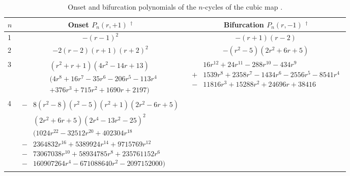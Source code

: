 \documentclass[twocolumn]{revtex4-1}
\begin{document}
\begin{table*}[t]\footnotesize
\caption{Onset and bifurcation polynomials of the $n$-cycles of the cubic map .}
\begin{center}
\begin{tabular*}{\linewidth}{l c c}
\hline
$n$
&
Onset $P_n(r, +1)$ $^\dagger$
&
Bifurcation $P_n(r, -1)$ $^\dagger$
\\
\hline
1
&
$-(r-1)^2$
&
$-(r+1)(r-2)$
\\
2
&
$-2 (r-2) (r+1) (r+2)^2$
&
$-(r^2-5) (2 r^2+6 r+5)$
\\
3
&
\begin{minipage}{.45\linewidth}
\vspace{3mm}
$\begin{aligned}
&(r^2+r+1) (4 r^2-14 r+13) \\
&(4 r^8+16 r^7-35 r^6-206 r^5-113 r^4\\
&+376 r^3+715 r^2+1690 r+2197)
\end{aligned}$
\vspace{1mm}
\end{minipage}
&
\begin{minipage}{.5\linewidth}
\vspace{3mm}
$\begin{aligned}
&16 r^{12}+24 r^{11}-288 r^{10}-434 r^9\\
+&1539 r^8+2358 r^7-1434 r^6-2556 r^5-8541 r^4\\
-&11816 r^3+15288 r^2+24696 r+38416
\end{aligned}$
\vspace{1mm}
\end{minipage}
\\
4
&
\begin{minipage}{.45\linewidth}
\vspace{3mm}
$\begin{aligned}
-&8(r^2-8) (r^2-5) (r^2+1) (2 r^2-6 r+5) \\
&(2 r^2+6 r+5) (2 r^4-13 r^2-25)^2 \\
&(1024 r^{22}-32512 r^{20}+402304 r^{18} \\
-&2364832 r^{16}+5389924 r^{14}+9715769 r^{12} \\
-&73067038 r^{10}+58934785 r^{8}+235761152 r^6 \\
-&160907264 r^4-671088640 r^2-2097152000)
\end{aligned}$
\vspace{3mm}
\end{minipage}
&

\end{tabular*}
\end{center}
\end{table*}
\end{document}
